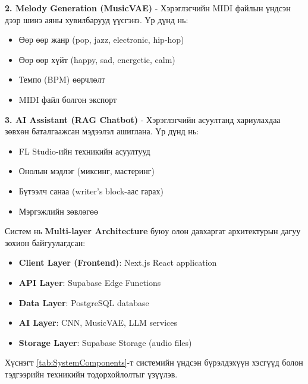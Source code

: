 \textbf{2. Melody Generation (MusicVAE)} - Хэрэглэгчийн MIDI файлын үндсэн дээр шинэ аяны хувилбарууд үүсгэнэ. Үр дүнд нь:
\begin{itemize}
    \item Өөр өөр жанр (pop, jazz, electronic, hip-hop)
    \item Өөр өөр хүйт (happy, sad, energetic, calm)
    \item Темпо (BPM) өөрчлөлт
    \item MIDI файл болгон экспорт
\end{itemize}

\textbf{3. AI Assistant (RAG Chatbot)} - Хэрэглэгчийн асуултанд хариулахдаа зөвхөн баталгаажсан мэдээлэл ашиглана. Үр дүнд нь:
\begin{itemize}
    \item FL Studio-ийн техникийн асуултууд
    \item Онолын мэдлэг (миксинг, мастеринг)
    \item Бүтээлч санаа (writer's block-аас гарах)
    \item Мэргэжлийн зөвлөгөө
\end{itemize}

Систем нь \textbf{Multi-layer Architecture} буюу олон давхаргат архитектурын дагуу зохион байгуулагдсан:

\begin{itemize}
    \item \textbf{Client Layer (Frontend)}: Next.js React application
    \item \textbf{API Layer}: Supabase Edge Functions
    \item \textbf{Data Layer}: PostgreSQL database
    \item \textbf{AI Layer}: CNN, MusicVAE, LLM services
    \item \textbf{Storage Layer}: Supabase Storage (audio files)
\end{itemize}

Хүснэгт \ref{tab:SystemComponents}-т системийн үндсэн бүрэлдэхүүн хэсгүүд болон тэдгээрийн техникийн тодорхойлолтыг үзүүлэв.

